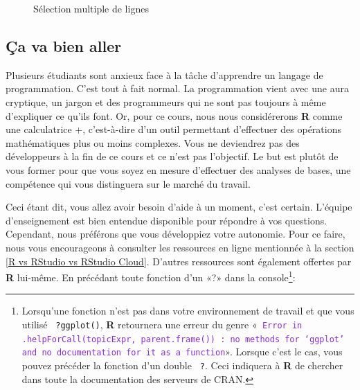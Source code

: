 \documentclass[10.5pt,a4paper]{article}
\newcommand{\rcode}[1]{\texttt{\color{rstudio} #1}}
\begin{document}
      \begin{figure}[H]
      \centering
      \caption{Sélection multiple de lignes}
      \label{altSelect}
      \end{figure}

  \subsection{Ça va bien aller}
  Plusieurs étudiants sont anxieux face à la tâche d'apprendre un langage de programmation. C'est tout à fait normal. La programmation vient avec une aura cryptique, un jargon et des programmeurs qui ne sont pas toujours à même d'expliquer ce qu'ils font. Or, pour ce cours, nous nous considérerons \textbf{R} comme une calculatrice +, c'est-à-dire d'un outil permettant d'effectuer des opérations mathématiques plus ou moins complexes. Vous ne deviendrez pas des développeurs à la fin de ce cours et ce n'est pas l'objectif. Le but est plutôt de vous former pour que vous soyez en mesure d'effectuer des analyses de bases, une compétence qui vous distinguera sur le marché du travail.

Ceci étant dit, vous allez avoir besoin d'aide à un moment, c'est certain. L'équipe d'enseignement est bien entendue disponible pour répondre à vos questions. Cependant, nous préférons que vous développiez votre autonomie. Pour ce faire, nous vous encourageons à consulter les ressources en ligne mentionnée à la section \ref{R vs RStudio vs RStudio Cloud}. D'autres ressources sont également offertes par \textbf{R} lui-même. En précédant toute fonction d'un «?» dans la console\footnote{Lorsqu'une fonction n'est pas dans votre environnement de travail et que vous utilisé \rcode{?ggplot()}, \textbf{R} retournera une erreur du genre «\textcolor{BlueViolet}{\rcode{Error in .helpForCall(topicExpr, parent.frame()) : no methods for ‘ggplot’ and no documentation for it as a function}}». Lorsque c'est le cas, vous pouvez précéder la fonction d'un double \rcode{?}. Ceci indiquera à \textbf{R} de chercher dans toute la documentation des serveurs de CRAN.}:
\end{document}
